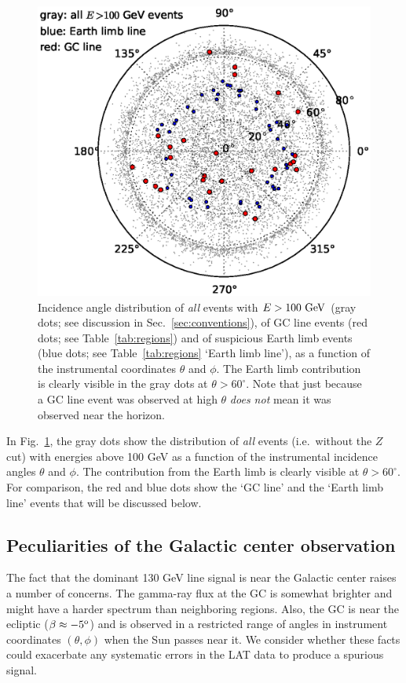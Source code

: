 \documentclass[aps,twocolumn,prd,superscriptaddress,showpacs,nofootinbib,fixfloat]{revtex4}
\newcommand{\GeV}{{\rm ~GeV}}
\newcommand{\degree}{^{\rm o}}
\begin{document}
\begin{figure}[h]
  \begin{center}
    \includegraphics[width=0.9\linewidth]{plots/polarCounts.eps}
    \vspace{-0.5cm}
  \end{center}
  \caption{Incidence angle distribution of \emph{all} events
  with $E>100\GeV$ (gray dots; see
  discussion in Sec.~\ref{sec:conventions}), of GC line
  events (red dots; see Table~\ref{tab:regions}) and of
  suspicious Earth limb events (blue dots; see
  Table~\ref{tab:regions} `Earth limb line'), as a function of
  the instrumental coordinates $\theta$ and $\phi$. The
  Earth limb contribution is clearly visible in the gray
  dots at $\theta > 60^\circ$.  Note that just because a GC line event was
  observed at high $\theta$ \emph{does not} mean it was observed near the
  horizon.}
  \label{fig:phiThetaDist}
\end{figure}

In
Fig.~\ref{fig:phiThetaDist}, the gray dots show the
distribution of \emph{all} events (i.e.~without the $Z$ cut)
with energies above 100 GeV as a function of the instrumental
incidence angles $\theta$ and $\phi$.
The contribution from the Earth limb is clearly visible at
$\theta>60^\circ$. For comparison, the red and blue dots
show the `GC line' and the `Earth limb line' events that
will be discussed below.

\subsection{Peculiarities of the Galactic center observation}
The fact that the dominant 130 GeV line signal is near the
Galactic center raises a number of concerns.  The gamma-ray
flux at the GC is somewhat brighter and might have a harder
spectrum than neighboring regions. Also, the GC is near the
ecliptic ($\beta \approx -5\degree$) and is observed in
a restricted range of angles in instrument coordinates
$(\theta, \phi)$ when the Sun passes near it.  We consider
whether these facts could exacerbate any systematic errors
in the LAT data to produce a spurious signal.
\end{document}
